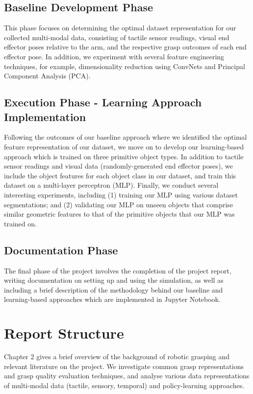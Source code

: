\documentclass[11pt, a4paper]{report}
\begin{document}
\subsection{Baseline Development Phase}
\label{sec:1.4.3}
This phase focuses on determining the optimal dataset representation for our collected multi-modal data, consisting of tactile sensor readings, visual end effector poses relative to the arm, and the respective grasp outcomes of each end effector pose. In addition, we experiment with several feature engineering techniques, for example, dimensionality reduction using ConvNets and Principal Component Analysis (PCA).


\subsection{Execution Phase - Learning Approach Implementation}
\label{sec:1.4.4}
Following the outcomes of our baseline approach where we identified the optimal feature representation of our dataset, we move on to develop our learning-based approach which is trained on three primitive object types. In addition to tactile sensor readings and visual data (randomly-generated end effector poses), we include the object features for each object class in our dataset, and train this dataset on a multi-layer perceptron (MLP). Finally, we conduct several interesting experiments, including (1) training our MLP using various dataset segmentations; and (2) validating our MLP on unseen objects that comprise similar geometric features to that of the primitive objects that our MLP was trained on.


\subsection{Documentation Phase}
\label{sec:1.4.5}
The final phase of the project involves the completion of the project report, writing documentation on setting up and using the simulation, as well as including a brief description of the methodology behind our baseline and learning-based approaches which are implemented in Jupyter Notebook.


\section{Report Structure}
\label{sec:1.5}
Chapter 2 gives a brief overview of the background of robotic grasping and relevant literature on the project. We investigate common grasp representations and grasp quality evaluation techniques, and analyse various data representations of multi-modal data (tactile, sensory, temporal) and policy-learning approaches.\\
\end{document}
